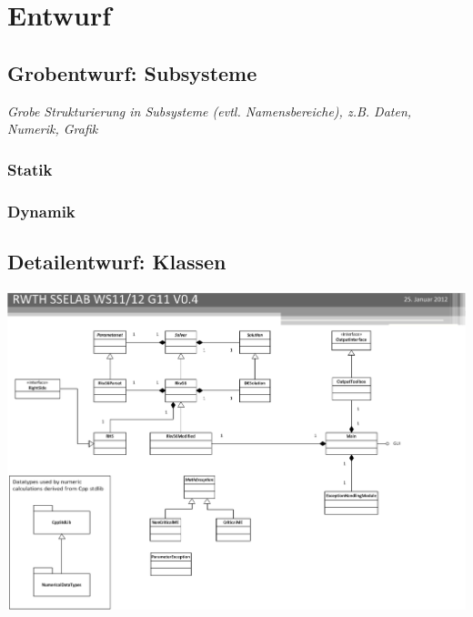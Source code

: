 \chapter{Entwurf}
\label{ch:3}

\section{Grobentwurf: Subsysteme}
\label{sec:3.1}

{\em Grobe Strukturierung in Subsysteme (evtl. Namensbereiche), z.B.
Daten, Numerik, Grafik} 

\subsection{Statik}

\subsection{Dynamik}

\section{Detailentwurf: Klassen}
\label{sec:3.2}
\includegraphics[width=6in,keepaspectratio=true]{RWTH_SSELAB_WS1112_CLASSES.eps}

